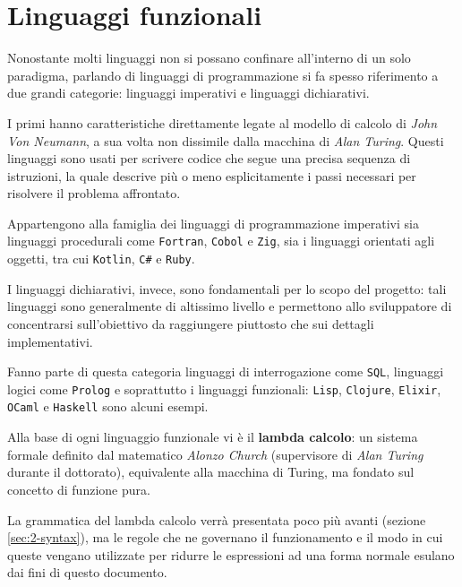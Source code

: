 \section{Linguaggi funzionali}
\label{sec:2-functional-languages}

Nonostante molti linguaggi non si possano confinare all'interno di un solo paradigma,
parlando di linguaggi di programmazione si fa spesso riferimento a due grandi categorie:
linguaggi imperativi e linguaggi dichiarativi.


I primi hanno caratteristiche direttamente legate al modello di calcolo di \textit{John Von Neumann},
a sua volta non dissimile dalla macchina di \textit{Alan Turing}.
Questi linguaggi sono usati per scrivere codice che segue una precisa sequenza di istruzioni,
la quale descrive più o meno esplicitamente i passi necessari per risolvere il problema affrontato.

\noindent Appartengono alla famiglia dei linguaggi di programmazione imperativi sia linguaggi procedurali come
\texttt{Fortran}, \texttt{Cobol} e \texttt{Zig}, sia i linguaggi orientati agli oggetti, tra cui \texttt{Kotlin}, \texttt{C\#} e \texttt{Ruby}.


I linguaggi dichiarativi, invece, sono fondamentali per lo scopo del progetto:
tali linguaggi sono generalmente di altissimo livello e permettono allo sviluppatore
di concentrarsi sull'obiettivo da raggiungere piuttosto che sui dettagli implementativi.

\noindent Fanno parte di questa categoria linguaggi di interrogazione come \texttt{SQL},
linguaggi logici come \texttt{Prolog} e soprattutto i linguaggi funzionali:
\texttt{Lisp}, \texttt{Clojure}, \texttt{Elixir}, \texttt{OCaml} e \texttt{Haskell} sono alcuni esempi.


Alla base di ogni linguaggio funzionale vi è il \textbf{lambda calcolo}: un sistema formale definito dal
matematico \textit{Alonzo Church} (supervisore di \textit{Alan Turing} durante il dottorato),
equivalente alla macchina di Turing, ma fondato sul concetto di funzione pura.

\newpage

\noindent La grammatica del lambda calcolo verrà presentata poco più avanti (sezione \ref{sec:2-syntax}),
ma le regole che ne governano il funzionamento e il modo in cui queste vengano utilizzate per ridurre
le espressioni ad una forma normale esulano dai fini di questo documento.

